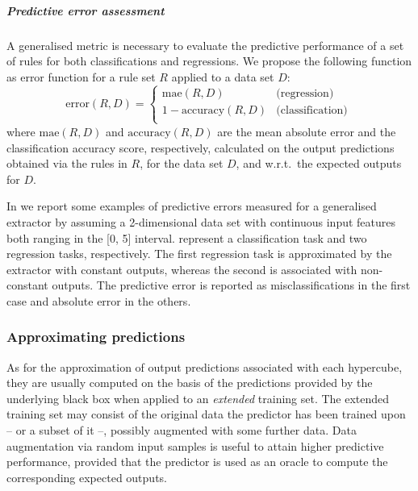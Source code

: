 \documentclass[
]{ceurart}
\begin{document}
\subparagraph{Predictive error assessment}

A generalised metric is necessary to evaluate the predictive performance of a set of rules for both classifications and regressions.
%
We propose the following function as error function for a rule set $R$ applied to a data set $D$:
%
\begin{equation}\label{eq:error}
	\text{error}(R, D) = 
	\begin{cases}
		\text{mae}(R, D) & \text{(regression)}\\
		1 - \text{accuracy}(R, D) & \text{(classification)}\\
	\end{cases}\,
\end{equation}
%
where $\text{mae}(R, D)$ and $\text{accuracy}(R, D)$ are the mean absolute error and the classification accuracy score, respectively, calculated on the output predictions obtained via the rules in $R$, for the data set $D$, and w.r.t.\ the expected outputs for $D$.



In  we report some examples of predictive errors measured for a generalised extractor by assuming a 2-dimensional data set with continuous input features both ranging in the [0, 5] interval.
%
 represent a classification task and two regression tasks, respectively.
%
The first regression task is approximated by the extractor with constant outputs, whereas the second is associated with non-constant outputs.
%
The predictive error is reported as misclassifications in the first case and absolute error in the others.
 
\subsubsection{Approximating predictions}

As for the approximation of output predictions associated with each hypercube, they are usually computed on the basis of the predictions provided by the underlying black box when applied to an \emph{extended} training set.
%
The extended training set may consist of the original data the predictor has been trained upon -- or a subset of it --, possibly augmented with some further data.
%
Data augmentation via random input samples is useful to attain higher predictive performance, provided that the predictor is used as an oracle to compute the corresponding expected outputs.
\end{document}
